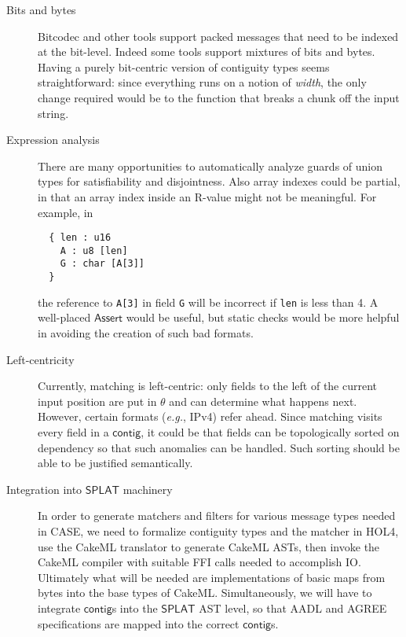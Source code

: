 \documentclass[svgnames]{llncs}
\newcommand{\eg}{\textit{e.g.}}
\newcommand{\konst}[1]{\ensuremath{\mathsf{#1}}}
\begin{document}
\begin{description}

\item [Bits and bytes] Bitcodec \cite{} and other tools support packed
  messages that need to be indexed at the bit-level. Indeed some tools
  support mixtures of bits and bytes. Having a purely bit-centric
  version of contiguity types seems straightforward: since everything
  runs on a notion of \emph{width}, the only change required would be
  to the function that breaks a chunk off the input string.

\item [Expression analysis] There are many opportunities to
  automatically analyze guards of union types for satisfiability and
  disjointness. Also array indexes could be partial, in that an array
  index inside an R-value might not be meaningful. For example, in

\begin{verbatim}
  { len : u16
    A : u8 [len]
    G : char [A[3]]
  }
\end{verbatim}

the reference to \verb+A[3]+ in field \verb+G+ will be incorrect if
\verb+len+ is less than 4. A well-placed \konst{Assert} would be
useful, but static checks would be more helpful in avoiding the
creation of such bad formats.

\item [Left-centricity] Currently, matching is left-centric: only
  fields to the left of the current input position are put in $\theta$
  and can determine what happens next. However, certain formats (\eg,
  IPv4) refer ahead. Since matching visits every field in a \konst{contig}, it
  could be that fields can be topologically sorted on dependency so
  that such anomalies can be handled. Such sorting should be able to
  be justified semantically.

\item [Integration into \konst{SPLAT} machinery] In order to generate
  matchers and filters for various message types needed in CASE, we
  need to formalize contiguity types and the matcher in HOL4, use the
  CakeML translator to generate CakeML ASTs, then invoke the CakeML
  compiler with suitable FFI calls needed to accomplish IO. Ultimately
  what will be needed are implementations of basic maps from bytes
  into the base types of CakeML. Simultaneously, we will have to
  integrate \konst{contig}s into the \konst{SPLAT} AST level, so that AADL and
  AGREE specifications are mapped into the correct \konst{contig}s.

\end{description}
\end{document}
